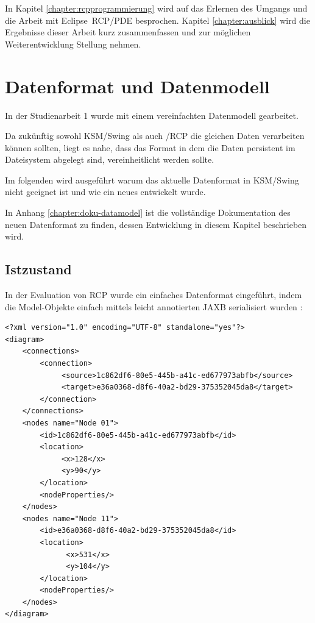 \documentclass[%
12pt,titlepage,abstracton,DIV=10,BCOR=0.5cm]{scrreprt}
\begin{document}
In Kapitel \ref{chapter:rcpprogrammierung} wird auf das Erlernen des Umgangs und
die Arbeit mit Eclipse~RCP/PDE besprochen. Kapitel \ref{chapter:ausblick}
wird die Ergebnisse dieser Arbeit kurz zusammenfassen und zur möglichen
Weiterentwicklung Stellung nehmen.

\chapter{Datenformat und Datenmodell}
In der Studienarbeit 1 wurde mit einem vereinfachten Datenmodell gearbeitet.

Da zukünftig sowohl KSM/Swing als auch /RCP die gleichen Daten verarbeiten
können sollten, liegt es nahe, dass das Format in dem die Daten persistent im
Dateisystem abgelegt sind, vereinheitlicht werden sollte.

Im folgenden wird ausgeführt warum das aktuelle Datenformat in KSM/Swing nicht
geeignet ist und wie ein neues entwickelt wurde.

\par
\begingroup
\leftskip=1.5cm %
\noindent In Anhang \ref{chapter:doku-datamodel} ist die vollständige Dokumentation des
neuen Datenformat zu finden, dessen Entwicklung in diesem Kapitel beschrieben
wird.
\par
\endgroup

\section{Istzustand}
In der Evaluation von RCP wurde ein einfaches Datenformat eingeführt, indem die
Model-Objekte einfach mittels leicht annotierten JAXB serialisiert wurden
\cite[S. 22f]{fischer10}: {\small
\begin{verbatim}
<?xml version="1.0" encoding="UTF-8" standalone="yes"?>
<diagram>
    <connections>
        <connection>
             <source>1c862df6-80e5-445b-a41c-ed677973abfb</source>
             <target>e36a0368-d8f6-40a2-bd29-375352045da8</target>
        </connection>
    </connections>
    <nodes name="Node 01">
        <id>1c862df6-80e5-445b-a41c-ed677973abfb</id>
        <location>
             <x>128</x>
             <y>90</y>
        </location>
        <nodeProperties/>
    </nodes>
    <nodes name="Node 11">
        <id>e36a0368-d8f6-40a2-bd29-375352045da8</id>
        <location>
              <x>531</x>
              <y>104</y>
        </location>
        <nodeProperties/>
    </nodes>
</diagram>
\end{verbatim}
}
\end{document}
